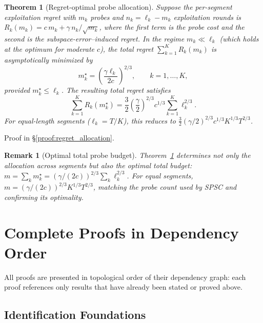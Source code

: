 \documentclass{article}
\newtheorem{theorem}{Theorem}
\newtheorem{remark}{Remark}
\begin{document}
\begin{theorem}[Regret-optimal probe allocation]
\label{thm:regret_allocation}
Suppose the per-segment exploitation regret with $m_k$ probes and $n_k = \ell_k - m_k$ exploitation rounds is
$R_k(m_k) = c\, m_k + \gamma \, n_k / \sqrt{m_k}$,
where the first term is the probe cost and the second is the subspace-error--induced regret.  In the regime $m_k \ll \ell_k$ (which holds at the optimum for moderate $c$), the total regret $\sum_{k=1}^K R_k(m_k)$ is asymptotically minimized by
\begin{equation}
m_k^\star = \left(\frac{\gamma \ell_k}{2c}\right)^{2/3}, \qquad k = 1, \ldots, K,
\label{eq:optimal_mk}
\end{equation}
provided $m_k^\star \le \ell_k$.  The resulting total regret satisfies
\begin{equation}
\sum_{k=1}^K R_k(m_k^\star) = \frac{3}{2}\left(\frac{\gamma}{2}\right)^{2/3} c^{1/3} \sum_{k=1}^K \ell_k^{2/3}.
\label{eq:total_regret_allocation}
\end{equation}
For equal-length segments ($\ell_k = T/K$), this reduces to $\frac{3}{2}(\gamma/2)^{2/3} c^{1/3} K^{1/3} T^{2/3}$.
\end{theorem}

Proof in \S\ref{proof:regret_allocation}.

\begin{remark}[Optimal total probe budget]
Theorem~\ref{thm:regret_allocation} determines not only the allocation across segments but also the optimal total budget: $m = \sum_k m_k^\star = (\gamma/(2c))^{2/3} \sum_k \ell_k^{2/3}$.  For equal segments, $m = (\gamma/(2c))^{2/3} K^{1/3} T^{2/3}$, matching the probe count used by SPSC and confirming its optimality.
\end{remark}

\section{Complete Proofs in Dependency Order}
\label{app:all_proofs}
\label{app:main_proofs}

All proofs are presented in topological order of their dependency graph: each proof references only results that have already been stated or proved above.

\subsection{Identification Foundations}
\end{document}

